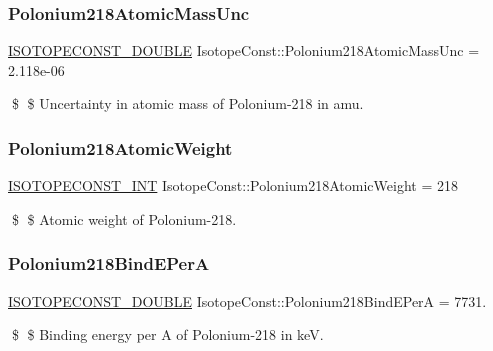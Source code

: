 \subsubsection{\texorpdfstring{Polonium218\+Atomic\+Mass\+Unc}{Polonium218AtomicMassUnc}}
{\footnotesize\ttfamily \mbox{\hyperlink{group___isotope_const-_macros_ga8f45a7272ce02c0b4c65c44636ed719a}{I\+S\+O\+T\+O\+P\+E\+C\+O\+N\+S\+T\+\_\+\+D\+O\+U\+B\+LE}} Isotope\+Const\+::\+Polonium218\+Atomic\+Mass\+Unc = 2.\+118e-\/06}

\$ \$ Uncertainty in atomic mass of Polonium-\/218 in amu. \mbox{\label{group___isotope_const-_polonium-_po218_gaaf08ad4776845b837fb2214cd8662c7a}} 
\subsubsection{\texorpdfstring{Polonium218\+Atomic\+Weight}{Polonium218AtomicWeight}}
{\footnotesize\ttfamily \mbox{\hyperlink{group___isotope_const-_macros_ga5f18360b3e99483a35c32d789e62621c}{I\+S\+O\+T\+O\+P\+E\+C\+O\+N\+S\+T\+\_\+\+I\+NT}} Isotope\+Const\+::\+Polonium218\+Atomic\+Weight = 218}

\$ \$ Atomic weight of Polonium-\/218. \mbox{\label{group___isotope_const-_polonium-_po218_gab4ccc832637f257feef1b81854a4e827}} 
\subsubsection{\texorpdfstring{Polonium218\+Bind\+E\+PerA}{Polonium218BindEPerA}}
{\footnotesize\ttfamily \mbox{\hyperlink{group___isotope_const-_macros_ga8f45a7272ce02c0b4c65c44636ed719a}{I\+S\+O\+T\+O\+P\+E\+C\+O\+N\+S\+T\+\_\+\+D\+O\+U\+B\+LE}} Isotope\+Const\+::\+Polonium218\+Bind\+E\+PerA = 7731.}

\$ \$ Binding energy per A of Polonium-\/218 in keV. \mbox{\label{group___isotope_const-_polonium-_po218_ga00427973394696e5e7da3b5371825137}} 
